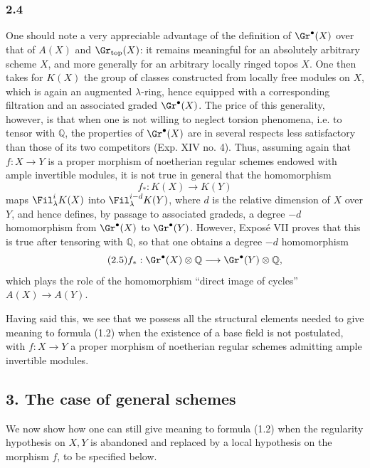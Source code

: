 \subsubsection*{2.4}
One should note a very appreciable advantage of the definition of $\Gr^\bullet(X)$ over that of $A(X)$ and $\Gr_{\mathrm{top}}(X)$: it remains meaningful for an absolutely arbitrary scheme $X$, and more generally for an arbitrary locally ringed topos $X$. One then takes for $K(X)$ the group of classes constructed from locally free modules on $X$, which is again an augmented $\lambda$-ring, hence equipped with a corresponding filtration and an associated graded $\Gr^\bullet(X)$. The price of this generality, however, is that when one is not willing to neglect torsion phenomena, i.e. to tensor with $\mathbb Q$, the properties of $\Gr^\bullet(X)$ are in several respects less satisfactory than those of its two competitors (Exp. XIV no. 4). Thus, assuming again that $f:X\to Y$ is a proper morphism of noetherian regular schemes endowed with ample invertible modules, it is not true in general that the homomorphism
\[
f_*:K(X)\longrightarrow K(Y)
\]
maps $\Fil^i_\lambda K(X)$ into $\Fil^{i-d}_\lambda K(Y)$, where $d$ is the relative dimension of $X$ over $Y$, and hence defines, by passage to associated gradeds, a degree $-d$ homomorphism from $\Gr^\bullet(X)$ to $\Gr^\bullet(Y)$. However, Exposé VII proves that this is true after tensoring with $\mathbb Q$, so that one obtains a degree $-d$ homomorphism
\begin{equation}\tag{2.5}
f_*:\Gr^\bullet(X)\otimes\mathbb Q\longrightarrow \Gr^\bullet(Y)\otimes\mathbb Q,
\end{equation}
which plays the role of the homomorphism ``direct image of cycles'' $A(X)\to A(Y)$.

Having said this, we see that we possess all the structural elements needed to give meaning to formula (1.2) when the existence of a base field is not postulated, with $f:X\to Y$ a proper morphism of noetherian regular schemes admitting ample invertible modules.

\subsection*{3. The case of general schemes}
We now show how one can still give meaning to formula (1.2) when the regularity hypothesis on $X,Y$ is abandoned and replaced by a local hypothesis on the morphism $f$, to be specified below.

